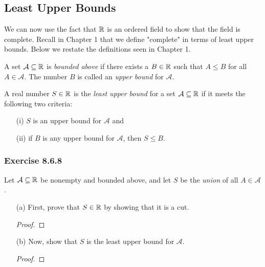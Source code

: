 \subsection{Least Upper Bounds}

We can now use the fact that \( \mathbb{R}  \) is an ordered field to show that the field is complete. Recall in Chapter 1 that we define "complete" in terms of least upper bounds. Below we restate the definitions seen in Chapter 1.

\begin{definition}
    A set \( \mathcal{A} \subseteq \mathbb{R}  \) is \textit{bounded above} if there exists a \( B \in \mathbb{R}  \) such that \( A \leq B  \) for all \( A \in \mathcal{A}  \). The number \( B  \) is called an \textit{upper bound} for \( \mathcal{A} \). 

    A real number \( S \in \mathbb{R}  \) is the \textit{least upper bound} for a set \( \mathcal{A} \subseteq \mathbb{R}  \) if it meets the following two criteria:
    \begin{enumerate}
        \item[(i)] \( S  \) is an upper bound for \( \mathcal{A}  \) and
        \item[(ii)] if \( B  \) is any upper bound for \( \mathcal{A}  \), then \( S \leq B  \).
    \end{enumerate}
\end{definition}

\subsubsection{Exercise 8.6.8} 
Let \( \mathcal{A} \subseteq \mathbb{R}  \) be nonempty and bounded above, and let \( S  \) be the \textit{union} of all \( A \in \mathcal{A}  \).  
\begin{enumerate}
    \item[(a)] First, prove that \( S \in \mathbb{R}  \) by showing that it is a cut.
        \begin{proof}
        
        \end{proof}
    \item[(b)] Now, show that \( S  \) is the least upper bound for \( \mathcal{A} \).
        \begin{proof}
        
        \end{proof}
\end{enumerate}




